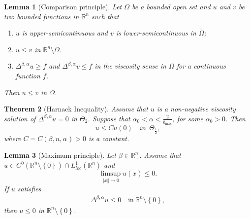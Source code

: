 \documentclass[10pt, leqno]{article}
\newtheorem{theorem}{Theorem}[section]
\newtheorem{lemma}[theorem]{Lemma}
\theoremstyle{definition}
\theoremstyle{remark}
\numberwithin{equation}{section}
\begin{document}
\begin{lemma}[Comparison principle]
\label{Comp. princ.}
Let $\Omega$ be a bounded open set and $u$ and $v$ be two bounded functions in $\mathbb{R}^{n}$ such that
\begin{enumerate}
\item $u$ is upper-semicontinuous and $v$ is lower-semicontinuous in $\overline{\Omega}$;
\item $u \leq v$ in $\mathbb{R}^{n} \setminus \Omega$.
\item $\Delta^{\beta, \alpha}u \geq f$ and $\Delta^{\beta, \alpha}v \leq f$ in the viscosity sense in $\Omega$ for a continuous function $f$.
\end{enumerate}
Then $u \leq v$ in $\Omega$.
\end{lemma}


\begin{theorem}[Harnack Inequality]
\label{Harnack Inequality}
Assume that $u$ is a non-negative viscosity solution of $\Delta^{\beta, \alpha}u = 0$ in $\Theta_{2}$. Suppose that $ \alpha_{0} < \alpha < \frac{2}{b_{\max}}$, for some $\alpha_{0} >0$. Then
$$u \leq C u \left( 0 \right) \quad  in \ \ \Theta_{\frac{1}{2}},$$
where $C=C(\beta, n, \alpha_{}) > 0$ is a constant.
\end{theorem}



\begin{lemma}[Maximum principle]
\label{max principle}
Let $\beta \in \mathbb{R}^{n}_{+}$. Assume that $u \in C^{0}_{}\left(\mathbb{R}^{n}\setminus \left\lbrace 0 \right\rbrace \right) \cap L^{1}_{loc}\left(\mathbb{R}^{n}\right)$ and
$$
\displaystyle\limsup_{\Vert x \Vert \rightarrow 0} u(x) \leq 0.
$$
If $u$ satisfies
\begin{eqnarray}
\Delta^{\beta, \alpha} u \leq 0 \quad \text{in} \ \mathbb{R}^{n}\setminus \left\lbrace 0 \right\rbrace,
\end{eqnarray}
then $u \leq 0$ in $\mathbb{R}^{n}\setminus \left\lbrace 0 \right\rbrace$.
\end{lemma}
\end{document}
